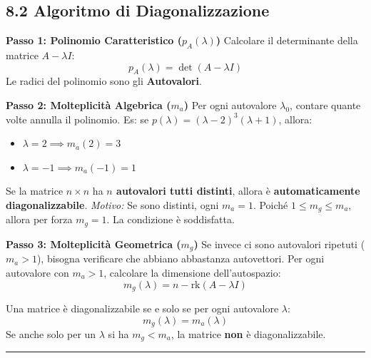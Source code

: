 \documentclass[10pt,a4paper]{article}
\begin{document}
\subsection*{8.2 Algoritmo di Diagonalizzazione}

\textbf{Passo 1: Polinomio Caratteristico ($p_A(\lambda)$)}
Calcolare il determinante della matrice $A - \lambda I$:
\[ p_A(\lambda) = \det(A - \lambda I) \]
Le radici del polinomio sono gli \textbf{Autovalori}.

\textbf{Passo 2: Molteplicità Algebrica ($m_a$)}
Per ogni autovalore $\lambda_0$, contare quante volte annulla il polinomio.
Es: se $p(\lambda) = (\lambda - 2)^3 (\lambda + 1)$, allora:
\begin{itemize}
    \item $\lambda = 2 \implies m_a(2) = 3$
    \item $\lambda = -1 \implies m_a(-1) = 1$
\end{itemize}

\vspace{0.2cm}
\begin{tcolorbox}[colback=green!5!white,colframe=green!50!black,title=\textbf{Autovalori Distinti}]
Se la matrice $n \times n$ ha \textbf{$n$ autovalori tutti distinti}, allora è \textbf{automaticamente diagonalizzabile}.
\textit{Motivo:} Se sono distinti, ogni $m_a = 1$. Poiché $1 \le m_g \le m_a$, allora per forza $m_g = 1$. La condizione è soddisfatta.
\end{tcolorbox}
\vspace{0.2cm}

\textbf{Passo 3: Molteplicità Geometrica ($m_g$)}
Se invece ci sono autovalori ripetuti ($m_a > 1$), bisogna verificare che abbiano abbastanza autovettori.
Per ogni autovalore con $m_a > 1$, calcolare la dimensione dell'autospazio:
\[ m_g(\lambda) = n - \text{rk}(A - \lambda I) \]

\vspace{0.3cm}

\begin{tcolorbox}[colback=blue!5!white,colframe=blue!75!black,title=\textbf{CRITERIO DI DIAGONALIZZABILITÀ}]
Una matrice è diagonalizzabile se e solo se per ogni autovalore $\lambda$:
\[ m_g(\lambda) = m_a(\lambda) \]
Se anche solo per un $\lambda$ si ha $m_g < m_a$, la matrice \textbf{non} è diagonalizzabile.
\end{tcolorbox}

\vspace{0.4cm}
\hrule
\vspace{0.4cm}
\end{document}
